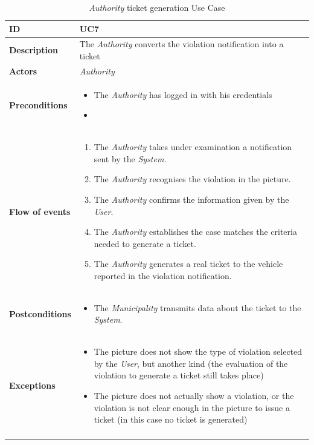 \documentclass {article}
\begin{document}
	\begin{longtable}{| p{3 cm} | p{10.5 cm} |} 
			\hline
			{\bf ID} & UC7 \\
			\hline
			{\bf Description} & The {\it Authority} converts the violation notification into a ticket \\
			\hline
			{\bf Actors} & {\it Authority}\\
			\hline
			{\bf Preconditions} & \begin{itemize}
								  \item The {\it Authority} has logged in with his credentials
								  \item
								  \end{itemize}	\\
			\hline
			{\bf Flow of events} &	\begin{enumerate}
								  \item The {\it Authority} takes under examination a notification sent by the {\it System}.
								  \item The {\it Authority} recognises the violation in the picture.
								  \item The {\it Authority} confirms the information given by the {\it User}.
								  \item The {\it Authority} establishes the case matches the criteria needed to generate a ticket.
								  \item The {\it Authority} generates a real ticket to the vehicle reported in the violation notification.
								  \end{enumerate}	\\
			\hline
			{\bf Postconditions} & \begin{itemize}
								  \item The {\it Municipality} transmits data about the ticket to the {\it System}.
								  \end{itemize}	 \\
			\hline
			{\bf Exceptions} & 	\begin{itemize}
								  \item The picture does not show the type of violation selected by the {\it User}, but another kind (the evaluation of the violation to generate a ticket still takes place)
								  \item The picture does not actually show a violation, or the violation is not clear enough in the picture to issue a ticket (in this case no ticket is generated)
								  \end{itemize}	\\
			\hline
			\caption{{\it Authority} ticket generation Use Case}
			\end{longtable}
			
\end{document}

